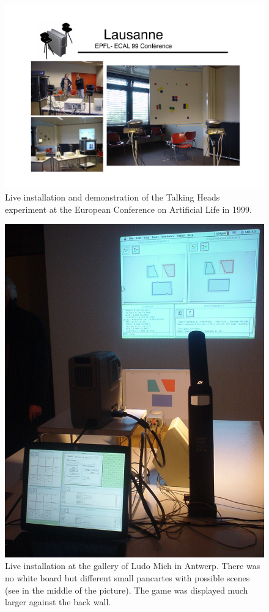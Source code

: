 \begin{figure}[t]
  \centerline{\includegraphics[width=.90\textwidth]{chap9/figs/Lausanne.pdf}}
\caption{\label{fig:lausanne}Live installation and demonstration of the Talking Heads experiment at the European Conference on Artificial 
Life in 1999.}
\end{figure}
\begin{figure}[htbp]
  \centerline{\includegraphics[width=.80\textwidth]{chap9/figs/mich-gallery.pdf}}
\caption{\label{fig:mich}Live installation at the gallery of Ludo Mich in Antwerp. There was no white board but different 
small pancartes with possible scenes (see in the middle of the picture). The game was displayed much larger against
the back wall.}
\end{figure}

